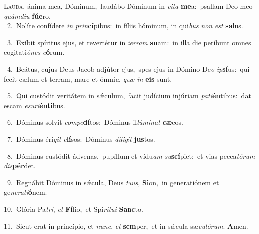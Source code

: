\lettrine{\initial\textcolor{\initialcolor}{L}}{auda,} ánima mea, Dóminum,~\dagger laudábo Dóminum in \textit{vi}\-\textit{ta} \textbf{me}\-a:~\star psallam Deo meo \textit{quám}\-\textit{di}\textit{u} \textbf{fú}\-\textbf{e}ro.\\
{\numbfont\textcolor{\numbcolor}{~2.}}~Nolíte confídere \textit{in} \textit{prin}\-\textbf{cí}pibus:~\star in fíliis hóminum, in qui\textit{bus} \textit{non} \textit{est} \textbf{sa}\-lus.\par
{\numbfont\textcolor{\numbcolor}{~3.}}~Exíbit spíritus ejus, et revertétur in \textit{ter}\-\textit{ram} \textbf{su}\-am:~\star in illa die períbunt omnes cogitati\-\textit{ó}\-\textit{nes} \textit{e}\-\textbf{ó}rum.\par
{\numbfont\textcolor{\numbcolor}{~4.}}~Beátus, cujus Deus Jacob adjútor ejus,~\dagger spes ejus in Dómino De\textit{o} \textit{ip}\-\textbf{sí}us:~\star qui fecit cælum et terram, mare et ómni\-\textit{a}\-, \textit{quæ} \textit{in} \textbf{e}\-\textbf{is} sunt.\par
{\numbfont\textcolor{\numbcolor}{~5.}}~Qui custódit veritátem in sǽculum,~\dagger facit judícium injúriam \textit{pa}\-\textit{ti}\textbf{én}tibus:~\star dat escam \textit{e}\-\textit{su}\textit{ri}\textbf{én}\textbf{ti}bus.\par
{\numbfont\textcolor{\numbcolor}{~6.}}~Dóminus solvit \textit{com}\-\textit{pe}\textbf{dí}tos:~\star Dóminus il\-\textit{lú}\-\textit{mi}\textit{nat} \textbf{cæ}\-cos.\par
{\numbfont\textcolor{\numbcolor}{~7.}}~Dóminus éri\textit{git} \textit{e}\-\textbf{lí}sos:~\star Dóminus \textit{dí}\-\textit{li}\textit{git} \textbf{jus}\-tos.\par
{\numbfont\textcolor{\numbcolor}{~8.}}~Dóminus custódit ádvenas,~\dagger pupíllum et vídu\textit{am} \textit{su}\-\textbf{scí}piet:~\star et vias pecca\-\textit{tó}\-\textit{rum} \textit{dis}\-\textbf{pér}det.\par
{\numbfont\textcolor{\numbcolor}{~9.}}~Regnábit Dóminus in sǽcula, Deus \textit{tu}\-\textit{us}, \textbf{Si}\-on,~\star in generatiónem et ge\-\textit{ne}\-\textit{ra}\textit{ti}\textbf{ó}nem.\par
{\numbfont\textcolor{\numbcolor}{10.}}~Glória Pa\-\textit{tri}\-, \textit{et} \textbf{Fí}\-lio,~\star et Spi\-\textit{rí}\-\textit{tu}\textit{i} \textbf{Sanc}\-to.\par
{\numbfont\textcolor{\numbcolor}{11.}}~Sicut erat in princípio, et \textit{nunc}\-, \textit{et} \textbf{sem}\-per,~\star et in sǽcula sæ\-\textit{cu}\-\textit{ló}\textit{rum}. \textbf{A}\-men.\par
